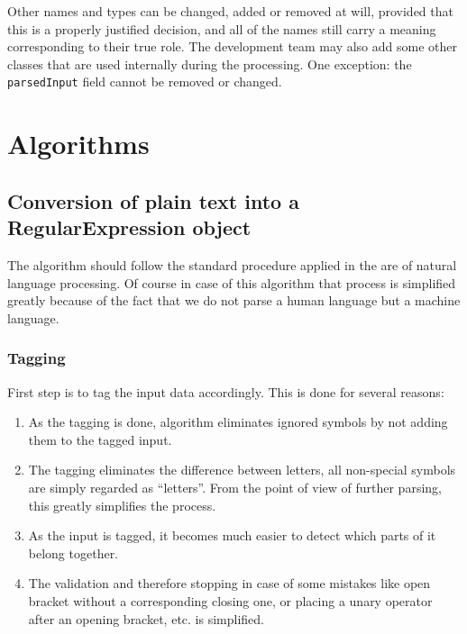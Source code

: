 \documentclass{article}
\begin{document}
Other names and types can be changed, added or removed at will, provided that this is a properly
justified decision, and all of the names still carry a meaning corresponding to their true role. The
development team may also add some other classes that are used internally during the processing. One
exception: the \verb|parsedInput| field cannot be removed or changed.

\newpage

\section{Algorithms}

\subsection{Conversion of plain text into a RegularExpression object}
The algorithm should follow the standard procedure applied in the are of natural language
processing. Of course in case of this algorithm that process is simplified greatly because of the
fact that we do not parse a human language but a machine language.

\subsubsection{Tagging}
First step is to tag the input data accordingly. This is done for several reasons:

\begin{enumerate}

  \item As the tagging is done, algorithm eliminates ignored symbols by not adding them to the
  tagged input.

  \item The tagging eliminates the difference between letters, all non-special symbols are simply
  regarded as ``letters''. From the point of view of further parsing, this greatly simplifies the
  process.

  \item As the input is tagged, it becomes much easier to detect which parts of it belong together.

  \item The validation and therefore stopping in case of some mistakes like open bracket without a
  corresponding closing one, or placing a unary operator after an opening bracket, etc. is
  simplified.

\end{enumerate}
\end{document}
